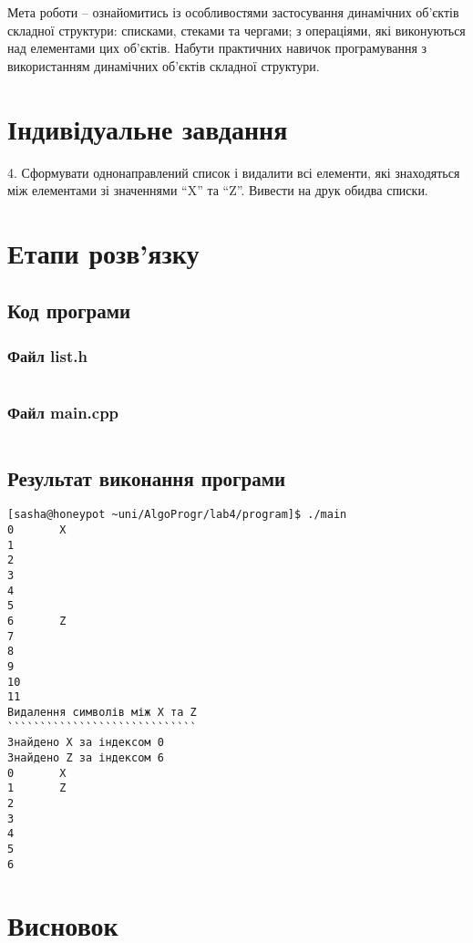 \documentclass[a4paper, 12pt, oneside]{extarticle}
\begin{document}
\Margins



Мета роботи – ознайомитись із особливостями застосування динамічних
об'єктів складної структури:  списками, стеками та чергами; з операціями, які
виконуються над елементами цих об'єктів. Набути практичних навичок
програмування з використанням динамічних об'єктів складної структури.

\section*{Індивідуальне завдання}

4. Сформувати однонаправлений список і видалити всі елементи, які
знаходяться між елементами зі значеннями “X” та “Z”. Вивести на друк
обидва списки.

\section*{Етапи розв'язку}

\subsection*{Код програми}

\subsubsection*{Файл list.h}
\inputminted{c++}{program/list.h}

\subsubsection*{Файл main.cpp}
\inputminted{c++}{program/main.cpp}

\subsection*{Результат виконання програми}

\begin{verbatim}
[sasha@honeypot ~uni/AlgoProgr/lab4/program]$ ./main
0       X
1
2
3
4
5
6       Z
7
8
9
10
11
Видалення символів між X та Z
`````````````````````````````
Знайдено X за індексом 0
Знайдено Z за індексом 6
0       X
1       Z
2
3
4
5
6
\end{verbatim}

\section*{Висновок}
\end{document}

